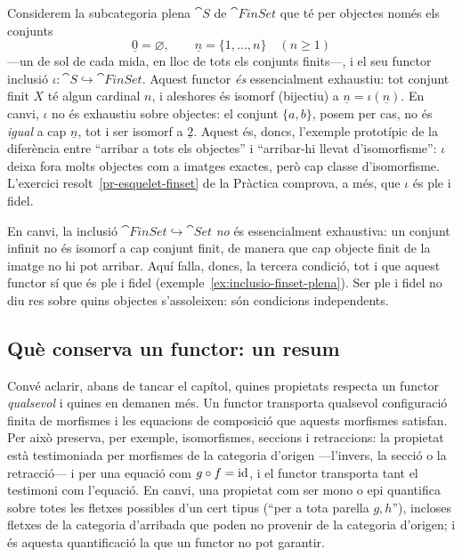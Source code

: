 \begin{exemple}\label{ex:ess-exhaustiu-finset}
Considerem la subcategoria plena $\cat{S}$ de $\cat{FinSet}$ que té per objectes només els conjunts
\[
\underline{0}=\varnothing,\qquad \underline{n}=\{1,\dots,n\}\quad(n\geq 1)
\]
---un de sol de cada mida, en lloc de tots els conjunts finits---, i el seu functor inclusió $\iota\colon\cat{S}\hookrightarrow\cat{FinSet}$. Aquest functor \emph{és} essencialment exhaustiu: tot conjunt finit $X$ té algun cardinal $n$, i aleshores és isomorf (bijectiu) a $\underline{n}=\iota(\underline{n})$. En canvi, $\iota$ no és exhaustiu sobre objectes: el conjunt $\{a,b\}$, posem per cas, no és \emph{igual} a cap $\underline{n}$, tot i ser isomorf a $\underline{2}$. Aquest és, doncs, l'exemple prototípic de la diferència entre \enquote{arribar a tots els objectes} i \enquote{arribar-hi llevat d'isomorfisme}: $\iota$ deixa fora molts objectes com a imatges exactes, però cap classe d'isomorfisme. L'exercici resolt~\ref{pr-esquelet-finset} de la Pràctica comprova, a més, que $\iota$ és ple i fidel.
\end{exemple}

\begin{exemple}
En canvi, la inclusió $\cat{FinSet}\hookrightarrow\cat{Set}$ \emph{no} és essencialment exhaustiva: un conjunt infinit no és isomorf a cap conjunt finit, de manera que cap objecte finit de la imatge no hi pot arribar. Aquí falla, doncs, la tercera condició, tot i que aquest functor sí que és ple i fidel (exemple~\ref{ex:inclusio-finset-plena}). Ser ple i fidel no diu res sobre quins objectes s'assoleixen: són condicions independents.
\end{exemple}

\subsection{Què conserva un functor: un resum}\label{subsec:que-conserva}

Convé aclarir, abans de tancar el capítol, quines propietats respecta un functor \emph{qualsevol} i quines en demanen més. Un functor transporta qualsevol configuració finita de morfismes i les equacions de composició que aquests morfismes satisfan. Per això preserva, per exemple, isomorfismes, seccions i retraccions: la propietat està testimoniada per morfismes de la categoria d'origen ---l'invers, la secció o la retracció--- i per una equació com $g\circ f=\operatorname{id}$, i el functor transporta tant el testimoni com l'equació. En canvi, una propietat com ser mono o epi quantifica sobre totes les fletxes possibles d'un cert tipus (\enquote{per a tota parella $g,h$}), incloses fletxes de la categoria d'arribada que poden no provenir de la categoria d'origen; i és aquesta quantificació la que un functor no pot garantir.

